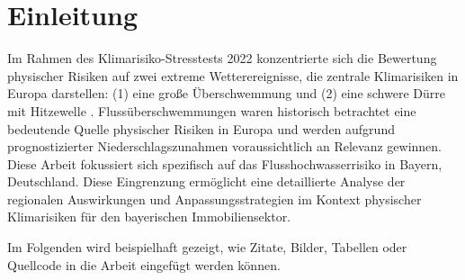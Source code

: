 \section{Einleitung}

Im Rahmen des Klimarisiko-Stresstests 2022 konzentrierte sich die Bewertung physischer Risiken auf zwei extreme Wetterereignisse, die zentrale Klimarisiken in Europa darstellen: (1) eine große Überschwemmung und (2) eine schwere Dürre mit Hitzewelle \parencite{ECB2022ClimateStressTest}. Flussüberschwemmungen waren historisch betrachtet eine bedeutende Quelle physischer Risiken in Europa und werden aufgrund prognostizierter Niederschlagszunahmen voraussichtlich an Relevanz gewinnen.
Diese Arbeit fokussiert sich spezifisch auf das Flusshochwasserrisiko in Bayern, Deutschland. Diese Eingrenzung ermöglicht eine detaillierte Analyse der regionalen Auswirkungen und Anpassungsstrategien im Kontext physischer Klimarisiken für den bayerischen Immobiliensektor.

Im Folgenden wird beispielhaft gezeigt, wie Zitate, Bilder, Tabellen oder Quellcode in die Arbeit eingefügt werden können.

